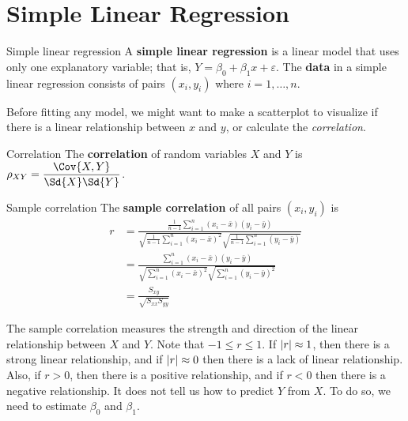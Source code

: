 \section{Simple Linear Regression}
\begin{Definition}{Simple linear regression}{}
    A \textbf{simple linear regression}
    is a linear model that uses only one
    explanatory variable; that is,
    $ Y=\beta_0+\beta_1x+\varepsilon $.
    The \textbf{data}
    in a simple linear regression consists of pairs $ (x_i,y_i) $
    where $ i=1,\ldots,n $.
\end{Definition}
\begin{Remark}{}{}
    Before fitting any model, we might want
    to make a scatterplot to visualize if there
    is a linear relationship between $ x $ and $ y $,
    or calculate the \emph{correlation}.
\end{Remark}
\begin{Definition}{Correlation}{}
    The \textbf{correlation} of
    random variables $ X $ and $ Y $ is
    $ \rho_{XY}=\dfrac{\Cov{X,Y}}{\Sd{X}\Sd{Y}} $.
\end{Definition}
\begin{Definition}{Sample correlation}{}
    The \textbf{sample correlation} of
    all pairs $ (x_i,y_i) $ is
    \begin{align*}
        r
         & =\frac{\frac{1}{n-1} \sum_{i=1}^{n}(x_i-\bar{x})(y_i-\bar{y})}
        {\sqrt{\frac{1}{n-1}\sum_{i=1}^{n} (x_i-\bar{x})^2}
            \sqrt{\frac{1}{n-1}\sum_{i=1}^{n}(y_i-\bar{y})}}              \\
         & =\frac{\sum_{i=1}^{n} (x_i-\bar{x})(y_i-\bar{y})}{
            \sqrt{\sum_{i=1}^{n} (x_i-\bar{x})^2}
            \sqrt{\sum_{i=1}^{n} (y_i-\bar{y})^2}
        }                                                                 \\
         & =\frac{S_{xy}}{\sqrt{S_{xx}S_{yy}}}
    \end{align*}
\end{Definition}
\begin{Remark}{}{}
    The sample correlation measures the strength and direction of
    the linear relationship between $ X $ and $ Y $. Note
    that $ -1\leqslant r\leqslant 1 $.
    If $ \lvert r\rvert\approx 1 $, then
    there is a strong linear relationship, and if
    $ \lvert r\rvert\approx 0 $
    then there is a lack of linear relationship. Also, if $ r>0 $,
    then there is a positive relationship, and if $ r<0 $
    then there is a negative relationship.
    It does not tell us how to predict $ Y $ from $ X $. To do so,
    we need to estimate $ \beta_0 $ and $ \beta_1 $.
\end{Remark}

